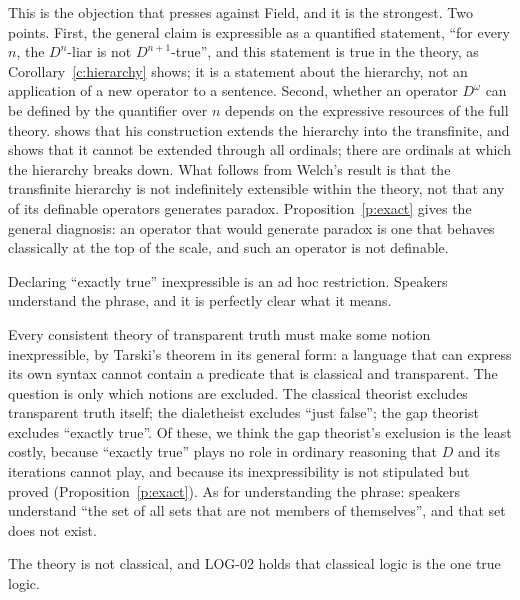 \documentclass{situationist-preprint}
\begin{document}
\begin{reply}
This is the objection that \citet{Priest2010} presses against Field, and it is the strongest. Two points. First, the general claim is expressible as a quantified statement, \enquote{for every $n$, the $D^n$-liar is not $D^{n+1}$-true}, and this statement is true in the theory, as Corollary~\ref{c:hierarchy} shows; it is a statement about the hierarchy, not an application of a new operator to a sentence. Second, whether an operator $D^\omega$ can be defined by the quantifier over $n$ depends on the expressive resources of the full theory. \citet{Field2008} shows that his construction extends the hierarchy into the transfinite, and \citet{Welch2008} shows that it cannot be extended through all ordinals; there are ordinals at which the hierarchy breaks down. What follows from Welch's result is that the transfinite hierarchy is not indefinitely extensible within the theory, not that any of its definable operators generates paradox. Proposition~\ref{p:exact} gives the general diagnosis: an operator that would generate paradox is one that behaves classically at the top of the scale, and such an operator is not definable.
\end{reply}

\begin{objection}
Declaring \enquote{exactly true} inexpressible is an ad hoc restriction. Speakers understand the phrase, and it is perfectly clear what it means.
\end{objection}

\begin{reply}
Every consistent theory of transparent truth must make some notion inexpressible, by Tarski's theorem in its general form: a language that can express its own syntax cannot contain a predicate that is classical and transparent. The question is only which notions are excluded. The classical theorist excludes transparent truth itself; the dialetheist excludes \enquote{just false}; the gap theorist excludes \enquote{exactly true}. Of these, we think the gap theorist's exclusion is the least costly, because \enquote{exactly true} plays no role in ordinary reasoning that $D$ and its iterations cannot play, and because its inexpressibility is not stipulated but proved (Proposition~\ref{p:exact}). As for understanding the phrase: speakers understand \enquote{the set of all sets that are not members of themselves}, and that set does not exist.
\end{reply}

\begin{objection}
The theory is not classical, and LOG-02 holds that classical logic is the one true logic.
\end{objection}
\end{document}
